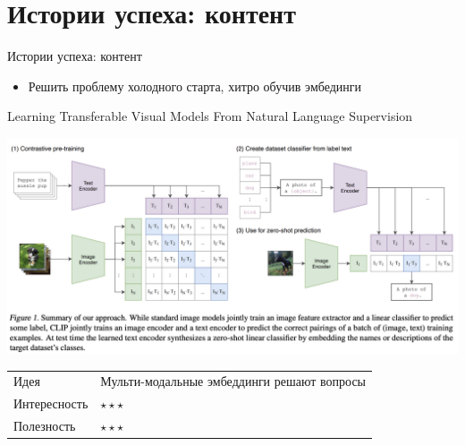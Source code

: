 \documentclass[11pt,aspectratio=169,handout]{beamer}
\begin{document}
\section{Истории успеха: контент}

\begin{frame}{Истории успеха: контент}

\begin{tcolorbox}[colback=info!5,colframe=info!80,title=Как оставить след в науке]
\begin{itemize}
\item Решить проблему холодного старта, хитро обучив эмбединги
\end{itemize}
\end{tcolorbox}

\end{frame}

\begin{frame}{Learning Transferable Visual Models From Natural Language Supervision \cite{CLIP}}

\begin{center}
\includegraphics[scale=0.25]{images/clip.png}
\end{center}

\vfill
\begin{small}
\begin{tabular}{l l}
Идея & Мульти-модальные эмбеддинги решают вопросы \\
Интересность & $\star\star\star$ \\
Полезность & $\star\star\star$
\end{tabular}
\end{small}

\end{frame}
\end{document}
